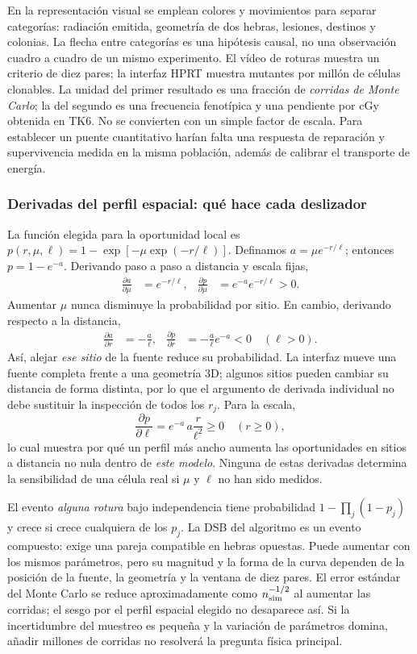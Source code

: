 \documentclass[11pt,a4paper,oneside]{article}
\begin{document}
En la representación visual se emplean colores y movimientos para
separar categorías: radiación emitida, geometría de dos hebras,
lesiones, destinos y colonias. La flecha entre categorías es una
hipótesis causal, no una observación cuadro a cuadro de un mismo
experimento. El vídeo de roturas muestra un criterio de diez pares;
la interfaz HPRT muestra mutantes por millón de células clonables.
La unidad del primer resultado es una fracción de \emph{corridas de
Monte Carlo}; la del segundo es una frecuencia fenotípica y una
pendiente por cGy obtenida en TK6. No se convierten con un simple
factor de escala. Para establecer un puente cuantitativo harían falta
una respuesta de reparación y supervivencia medida en la misma
población, además de calibrar el transporte de energía.

\subsubsection{Derivadas del perfil espacial: qué hace cada deslizador}
La función elegida para la oportunidad local es
$p(r,\mu,\ell)=1-\exp[-\mu\exp(-r/\ell)]$.
Definamos $a=\mu e^{-r/\ell}$; entonces $p=1-e^{-a}$.
Derivando paso a paso a distancia y escala fijas,
\begin{align}
\frac{\partial a}{\partial\mu}&=e^{-r/\ell},&
\frac{\partial p}{\partial\mu}
 &=e^{-a}e^{-r/\ell}>0.
\end{align}
Aumentar $\mu$ nunca disminuye la probabilidad por sitio. En cambio,
derivando respecto a la distancia,
\begin{align}
\frac{\partial a}{\partial r}&=-\frac{a}{\ell},&
\frac{\partial p}{\partial r}&=-\frac{a}{\ell}e^{-a}<0
\quad(\ell>0).
\end{align}
Así, alejar \emph{ese sitio} de la fuente reduce su probabilidad.
La interfaz mueve una fuente completa frente a una geometría 3D;
algunos sitios pueden cambiar su distancia de forma distinta, por lo
que el argumento de derivada individual no debe sustituir la
inspección de todos los $r_j$. Para la escala,
\[
\frac{\partial p}{\partial\ell}
=e^{-a}\,a\frac{r}{\ell^2}\geq0
\quad(r\geq0),
\]
lo cual muestra por qué un perfil más ancho aumenta las oportunidades
en sitios a distancia no nula dentro de \emph{este modelo}.
Ninguna de estas derivadas determina la sensibilidad de una célula
real si $\mu$ y $\ell$ no han sido medidos.

El evento \emph{alguna rotura} bajo independencia tiene probabilidad
$1-\prod_j(1-p_j)$ y crece si crece cualquiera de los $p_j$.
La DSB del algoritmo es un evento compuesto: exige una pareja
compatible en hebras opuestas. Puede aumentar con los mismos
parámetros, pero su magnitud y la forma de la curva dependen de la
posición de la fuente, la geometría y la ventana de diez pares.
El error estándar del Monte Carlo se reduce aproximadamente como
$n_{\rm sim}^{-1/2}$ al aumentar las corridas; el sesgo por el
perfil espacial elegido no desaparece así. Si la incertidumbre del
muestreo es pequeña y la variación de parámetros domina, añadir
millones de corridas no resolverá la pregunta física principal.
\end{document}
